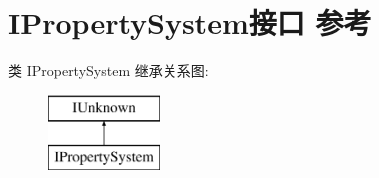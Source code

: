 \hypertarget{interface_i_property_system}{}\section{I\+Property\+System接口 参考}
\label{interface_i_property_system}
类 I\+Property\+System 继承关系图\+:\begin{figure}[H]
\begin{center}
\leavevmode
\includegraphics[height=2.000000cm]{interface_i_property_system}
\end{center}
\end{figure}
